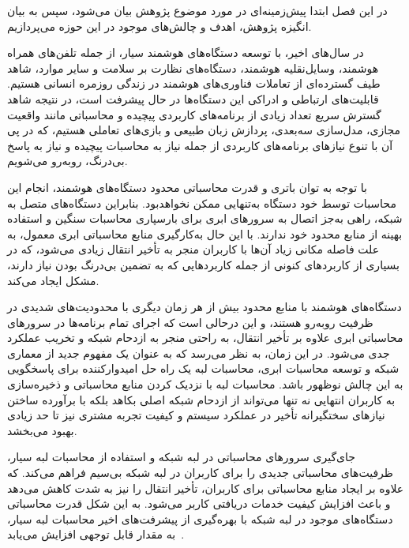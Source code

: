 


در این فصل ابتدا پیش‌زمینه‌ای در مورد موضوع پژوهش بیان می‌شود، سپس به بیان انگیزه پژوهش، اهدف و چالش‌های موجود در این حوزه می‌پردازیم.



در سال‌های اخیر، با توسعه دستگاه‌های هوشمند سیار، از جمله تلفن‌های همراه هوشمند، وسایل‌نقلیه هوشمند، دستگاه‌های نظارت بر سلامت و سایر موارد، شاهد طیف گسترده‌ای از تعاملات فناوری‌های هوشمند در زندگی روزمره انسانی هستیم. قابلیت‌های ارتباطی و ادراکی این دستگاه‌ها در حال پیشرفت است، در نتیجه شاهد گسترش سریع تعداد زیادی از برنامه‌های کاربردی پیچیده و محاسباتی مانند واقعیت مجازی، مدل‌سازی سه‌بعدی، پردازش زبان طبیعی و بازی‌های تعاملی هستیم، که در پی آن با تنوع نیاز‌های برنامه‌های کاربردی از جمله نیاز به محاسبات پیچیده و نیاز به پاسخ بی‌درنگ، روبه‌رو می‌شویم. 

با توجه به توان باتری و قدرت محاسباتی محدود دستگاه‌های هوشمند، انجام این محاسبات توسط خود دستگاه به‌تنهایی ممکن نخواهدبود. بنابراین دستگاه‌های متصل به شبکه، راهی به‌جز اتصال به سرورهای ابری برای بارسپاری محاسبات سنگین و استفاده بهینه از منابع محدود خود ندارند. با این حال به‌کارگیری منابع محاسباتی ابری معمول، به علت فاصله مکانی زیاد آن‌ها با کاربران منجر به تأخیر انتقال زیادی می‌شود، که در بسیاری از کاربردهای کنونی از جمله کاربردهایی که به تضمین بی‌درنگ بودن نیاز دارند، مشکل ایجاد می‌کند.

دستگاه‌های هوشمند با منابع محدود بیش از هر زمان دیگری با محدودیت‌های شدیدی در ظرفیت روبه‌رو هستند، و این درحالی است که اجرای تمام برنامه‌ها در سرورهای محاسباتی ابری علاوه بر تأخیر انتقال، به راحتی منجر به ازدحام شبکه و تخریب عملکرد جدی می‌شود. در این زمان، به نظر می‌رسد که به عنوان یک مفهوم جدید از معماری شبکه و توسعه محاسبات ابری، محاسبات لبه یک راه حل امیدوارکننده برای پاسخگویی به این چالش نوظهور باشد. محاسبات لبه با نزدیک کردن منابع محاسباتی و ذخیره‌سازی به کاربران انتهایی نه تنها می‌تواند از ازدحام شبکه اصلی بکاهد بلکه با برآورده ساختن نیازهای سختگیرانه تأخیر در  عملکرد سیستم و کیفیت تجربه مشتری نیز تا حد زیادی بهبود می‌بخشد. 

جای‌گیری سرورهای محاسباتی در لبه شبکه و استفاده از محاسبات لبه‌ سیار، ظرفیت‌های محاسباتی جدیدی را برای کاربران در لبه شبکه بی‌سیم فراهم می‌کند. که علاوه بر ایجاد منابع محاسباتی برای کاربران، تأخیر انتقال را نیز به شدت کاهش می‌دهد و باعث افزایش کیفیت خدمات دریافتی کاربر می‌شود. به این شکل قدرت محاسباتی دستگاه‌های موجود در لبه شبکه با بهره‌گیری از پیشرفت‌های اخیر محاسبات لبه سیار، به مقدار قابل توجهی افزایش می‌یابد~\cite{mao2016dynamic}.

